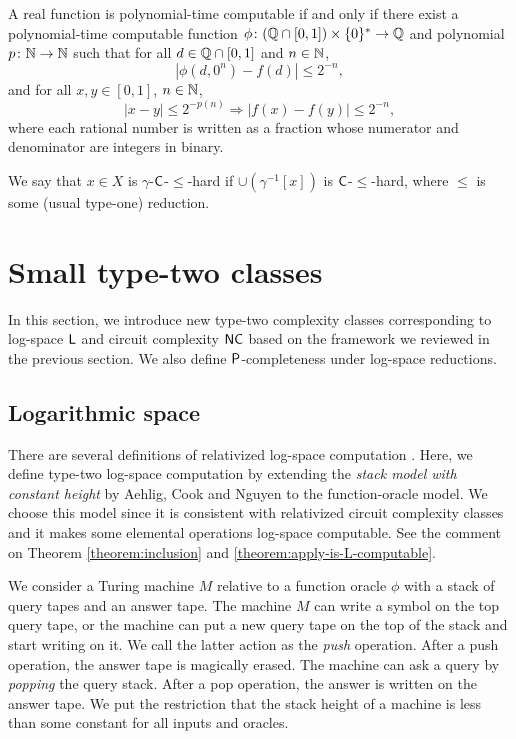 \documentclass[envcountsame,orivec,oribibl]{llncs}
\begin{document}
\begin{lemma}
 \label{lem:type1representation}
 A real function is polynomial-time computable if and only if
 there exist a polynomial-time computable function 
 $\phi \colon (\mathbb Q \cap [0, 1]) \times \{0\} ^* \to \mathbb Q$ and 
 polynomial $p \colon \mathbb N \to \mathbb N$ such that
 for all $d \in \mathbb Q \cap [0,1]$ and $n \in \mathbb N$,
 \begin{equation}
  |\phi(d, 0^n) - f(d)| \le 2^{-n},
 \end{equation}
 and for all $x, y \in [0, 1]$, $n \in \mathbb N$,
 \begin{equation} 
  |x-y| \le 2^{-p(n)} \Rightarrow |f(x) - f(y)| \le 2^{-n},
   \label{eq:modulus}
 \end{equation}
where each rational number is written
as a fraction whose numerator and denominator
are integers in binary.
\end{lemma}


We say that $x \in X$ is $\gamma$-$\mathsf{C}$-$\le$-hard if
$\cup(\gamma^{-1}[x])$ is $\mathsf{C}$-$\le$-hard,
where $\le$ is some (usual type-one) reduction.


\section{Small type-two classes}
\label{section:small-classes}

In this section, we introduce new type-two complexity classes
corresponding to log-space $\mathsf{L}$ and circuit complexity $\mathsf{NC}$
based on the framework we reviewed in the previous section.
We also define $\mathsf{P}$-completeness under log-space reductions.

\subsection{Logarithmic space}
There are several definitions of relativized log-space computation
\cite{aehlig2007relativizing,buss1988relativized,ladner1976relativization,wilson1988measure, ota2013logspace}.
Here, we define type-two log-space computation 
by extending the {\em stack model with constant height} 
by Aehlig, Cook and Nguyen \cite{aehlig2007relativizing} to the 
function-oracle model.
We choose this model since it is consistent with relativized circuit complexity classes 
and it makes some elemental operations log-space computable.
See the comment on Theorem \ref{theorem:inclusion} and \ref{theorem:apply-is-L-computable}.


We consider a Turing machine $M$ relative to a function oracle $\phi$
with a stack of query tapes and an answer tape.
The machine $M$ can write a symbol on the top query tape, or the machine can
put a new query tape on the top of the stack and start writing on it.
We call the latter action as the {\em push} operation.
After a push operation, the answer tape is magically erased.
The machine can ask a query by {\em popping} the query stack.
After a pop operation, the answer is written on the answer tape.
We put the restriction that the stack height of a machine is less than 
some constant for all inputs and oracles.
\end{document}
